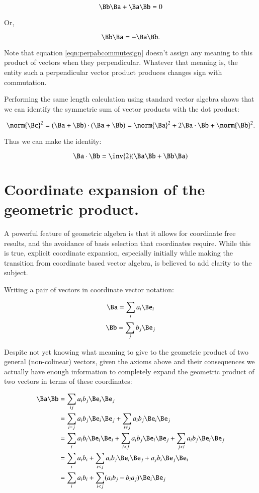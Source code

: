 \documentclass{article}      %
\begin{document}
\[
\Bb\Ba + \Ba\Bb = 0
\]

Or, 

\begin{equation}\label{eqn:perpabcommutesign}
\Bb\Ba = -\Ba\Bb.
\end{equation}

Note that equation \ref{eqn:perpabcommutesign} doesn't assign any meaning to this product of vectors when they perpendicular.
Whatever that meaning is, the entity such a perpendicular vector product produces changes sign
with commutation.

Performing the same length calculation using standard vector algebra shows that we can identify the symmetric 
sum of vector products with the dot product:

\begin{equation}\label{eqn:standarddot}
\norm{\Bc}^2 = (\Ba + \Bb) \cdot (\Ba + \Bb) = \norm{\Ba}^2 + 2 \Ba \cdot \Bb + \norm{\Bb}^2.
\end{equation}

Thus we can make the identity:

\begin{equation}\label{eqn:dotprod}
\Ba \cdot \Bb = \inv{2}(\Ba \Bb + \Bb \Ba)
\end{equation}

\section{ Coordinate expansion of the geometric product. }

A powerful feature of geometric algebra is that it allows for coordinate free results, and the avoidance of basis selection
that coordinates require.  While this is true, explicit coordinate expansion, especially
initially while making the transition from coordinate based vector algebra, is believed to add clarity to the subject.

Writing a pair of vectors in coordinate vector notation:

\[
\Ba = \sum_i{a_i \Be_i}
\]
\[
\Bb = \sum_j{b_j \Be_j}
\]

Despite not yet 
knowing what meaning to give to the geometric product of two general (non-colinear) vectors, 
given the axioms above and their consequences we actually have enough information to completely
expand the geometric product of two vectors in terms of these coordinates:

\begin{align*}
\Ba\Bb 
&= \sum_{ij}{a_i b_j \Be_i \Be_j} \\
&= \sum_{i = j} {a_i b_j \Be_i \Be_j} 
 + \sum_{i \ne j} {a_i b_j \Be_i \Be_j} \\
&= \sum_{i} {a_i b_i \Be_i \Be_i} 
 + \sum_{i < j} a_i b_j \Be_i \Be_j
 + \sum_{j < i} a_i b_j \Be_i \Be_j \\
&= \sum_{i} {a_i b_i} 
 + \sum_{i < j} a_i b_j \Be_i \Be_j + a_j b_i \Be_j \Be_i \\
&= \sum_{i} {a_i b_i} 
 + \sum_{i < j} (a_i b_j - b_i a_j)\Be_i \Be_j \\
\end{align*}
\end{document}
